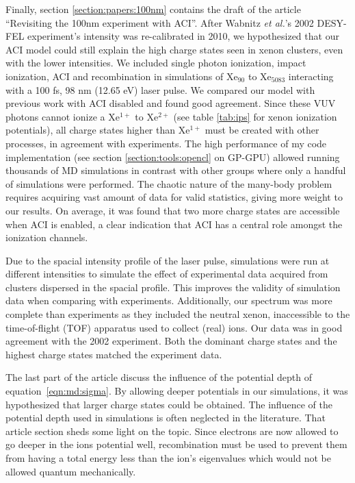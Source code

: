 Finally, section \ref{section:papers:100nm} contains the draft of the article
``Revisiting the 100nm experiment with ACI''. After Wabnitz \textit{et al.}'s
2002 DESY-FEL experiment's intensity was re-calibrated in 2010, we hypothesized
that our ACI model could still explain the high charge states seen in xenon
clusters, even with the lower intensities. We included single photon ionization,
impact ionization, ACI and recombination in simulations of Xe$_{90}$ to Xe$_{5083}$
interacting with a 100 fs, 98 nm (12.65 eV) laser pulse. We compared our model
with previous work with ACI disabled and found good agreement. Since these VUV
photons cannot ionize a Xe$^{1+}$ to Xe$^{2+}$ (see table \ref{tab:ips} for xenon
ionization potentials), all charge states higher than Xe$^{1+}$ must be created
with other processes, in agreement with experiments. The high performance of my
code implementation (see section \ref{section:tools:opencl} on GP-GPU) allowed
running thousands of MD simulations in contrast with other groups where only
a handful of simulations were performed. The chaotic nature of the many-body
problem requires acquiring vast amount of data for valid statistics, giving more
weight to our results. On average, it was found that two more charge states are
accessible when ACI is enabled, a clear indication that ACI has a central role
amongst the ionization channels.


Due to the spacial intensity profile of the laser pulse, simulations were run
at different intensities to simulate the effect of experimental data acquired
from clusters dispersed in the spacial profile. This improves the validity of
simulation data when comparing with experiments. Additionally, our spectrum
was more complete than experiments as they included the neutral xenon,
inaccessible to the time-of-flight (TOF) apparatus used to collect (real) ions.
Our data was in good agreement with the 2002 experiment. Both the dominant
charge states and the highest charge states matched the experiment data.

The last part of the article discuss the influence of the potential depth
of equation~\eqref{eqn:md:sigma}.
By allowing deeper potentials in our
simulations, it was hypothesized that larger charge states could be obtained.
The influence of the potential depth used in simulations is often neglected in
the literature. That article section sheds some light on the topic.
Since electrons are now allowed to go deeper in the ions potential well,
recombination must be used to prevent them from having a total energy less than
the ion's eigenvalues which would not be allowed quantum mechanically.

